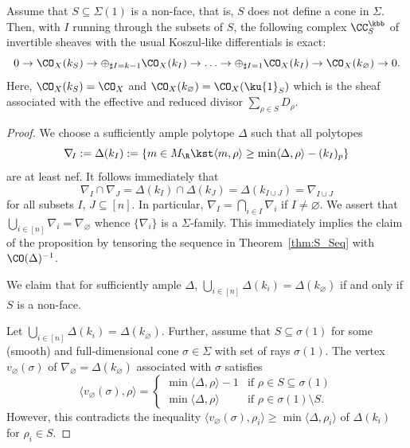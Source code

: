 \begin{prop}
\label{prop:Resol}
Assume that $S\subseteq\Sigma(1)$ is a non-face, 
that is, $S$ does not define a cone in $\Sigma$.
Then, with $I$ running through the subsets of $S$,
the following complex $\CC_S^\kbb$ of invertible 
sheaves with the usual Koszul-like differentials 
is exact:
$$
0\to\CO_X(k_S)\to 
\oplus_{\sharp I=k-1} \CO_X(k_I) \to\ldots\to
\oplus_{\sharp I=1} \CO_X(k_I) \to \CO_X(k_\varnothing)\to 0.
$$
Here, $\CO_X(k_S)=\CO_X$ and $\CO_X(k_\varnothing)=
\CO_X(\ku{1}_S)$ which is the sheaf associated with 
the effective and reduced divisor 
$\sum_{\rho\in S}D_\rho$.
\end{prop}

\begin{proof}
We choose a sufficiently ample polytope $\Delta$ 
such that all polytopes
$$
\nabla_{\! I}:=\Delta(k_I):=\{m\in M_{\R}\kst
\langle m,\rho\rangle \geq\min
\langle\Delta,\rho\rangle-(k_I)_p\}
$$
are at least nef. It follows immediately that
$$
\nabla_{\! I}\cap\nabla_{\! J}=\Delta(k_I)\cap 
\Delta(k_{J})=\Delta(k_{I\cup J})=\nabla_{\!I\cup J}
$$
for all subsets $I$, $J\subseteq[n]$. In particular, 
$\nabla_{\! I}=\bigcap_{i\in I}\nabla_{\! i}$ if
$I\not=\varnothing$. We assert that 
$\bigcup_{i\in[n]}\nabla_{\! i}=\nabla_{\!\varnothing}$
whence $\{\nabla_{\! i}\}$ is a $\Sigma$-family.
This immediately implies the claim of the proposition 
by tensoring the sequence in Theorem~\ref{thm:S_Seq} 
with $\CO(\Delta)^{-1}$.

We claim that for sufficiently ample $\Delta$, 
$\bigcup_{i\in[n]}\Delta(k_i)=\Delta(k_{\varnothing})$ 
if and only if $S$ is a non-face.

Let $\bigcup_{i\in[n]}\Delta(k_i)=\Delta(k_{\varnothing})$.
Further, assume that $S\subseteq\sigma(1)$ for some 
(smooth) and full-dimensional cone $\sigma\in\Sigma$ 
with set of rays $\sigma(1)$. The vertex 
$v_{\varnothing}(\sigma)$ of 
$\nabla_{\!\varnothing}=\Delta(k_{\varnothing})$
associated with $\sigma$ satisfies
$$
\langle v_{\varnothing}(\sigma),\rho\rangle=
\left\{\begin{array}{ll}
\min\langle\Delta,\rho\rangle-1 & 
\mbox{if }\rho\in S\subseteq\sigma(1)\\
\min\langle\Delta,\rho\rangle & 
\mbox{if }\rho\in \sigma(1)\setminus S.
\end{array}\right.
$$
However, this contradicts the inequality 
$\langle v_{\varnothing}(\sigma),\rho_i\rangle\geq 
\min\langle\Delta,\rho_i\rangle$
of $\Delta(k_i)$ for $\rho_i\in S$.


\end{proof}
